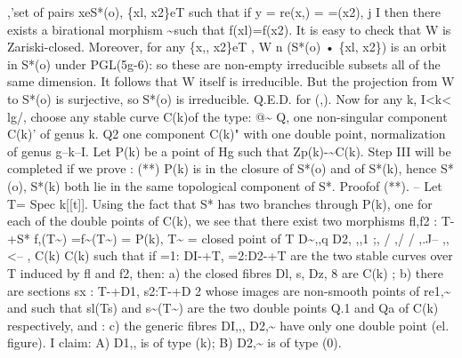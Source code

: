 \documentclass[11pt]{article}
\theoremstyle{plain}
\theoremstyle{definition}
\theoremstyle{remark}
\begin{document}
,'set of pairs xeS*(o), \{xl, x2\}eT such that if y = re(x,) = =(x2), j I then there exists a birational morphism \textasciitilde{}such that f(xl)=f(x2). It is easy to check that W is Zariski-closed. Moreover, for any \{x,, x2\}eT , W n (S*(o) • \{xl, x2\}) is an orbit in S*(o) under PGL(5g-6): so these are non-empty irreducible subsets all of the same dimension. It follows that W itself is irreducible. But the projection from W to S*(o) is surjective, so S*(o) is irreducible. Q.E.D. for (,). Now for any k, I<k< lg/, choose any stable curve C(k)of the type: @\textasciitilde{} Q, one non-singular component C(k)' of genus k. Q2 one component C(k)" with one double point, normalization of genus g--k--I. Let P(k) be a point of Hg such that Zp(k)-\textasciitilde{}C(k). Step III will be completed if we prove : (**) P(k) is in the closure of S*(o) and of S*(k), hence S*(o), S*(k) both lie in the same topological component of S*. Proofof (**). -- Let T= Spec k[[t]]. Using the fact that S* has two branches through P(k), one for each of the double points of C(k), we see that there exist two morphisms fl,f2 : T-+S* f,(T\textasciitilde{}) =f\textasciitilde{}(T\textasciitilde{}) = P(k), T\textasciitilde{} = closed point of T D\textasciitilde{},,q D2, ,,1 ;, / ,/ / ,.J-- ,, <-- , C(k) C(k) such that if =1: DI-+T, =2:D2-+T are the two stable curves over T induced by fl and f2, then: a) the closed fibres Dl, s, Dz, 8 are C(k) ; b) there are sections sx : T-+D1, s2:T-+D 2 whose images are non-smooth points of re1,\textasciitilde{} and such that sl(Ts) and s\textasciitilde{}(T\textasciitilde{}) are the two double points Q.1 and Qa of C(k) respectively, and : c) the generic fibres DI,,, D2,\textasciitilde{} have only one double point (el. figure). I claim: A) D1,, is of type (k); B) D2,\textasciitilde{} is of type (0).
\end{document}
